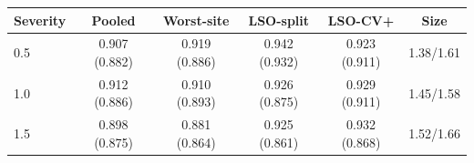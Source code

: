 \begin{tabular}{lccccc}
\toprule
Severity & Pooled & Worst-site & LSO-split & LSO-CV+ & Size \\
\midrule
0.5 & 0.907 (0.882) & 0.919 (0.886) & 0.942 (0.932) & 0.923 (0.911) & 1.38/1.61 \\
1.0 & 0.912 (0.886) & 0.910 (0.893) & 0.926 (0.875) & 0.929 (0.911) & 1.45/1.58 \\
1.5 & 0.898 (0.875) & 0.881 (0.864) & 0.925 (0.861) & 0.932 (0.868) & 1.52/1.66 \\
\bottomrule
\end{tabular}